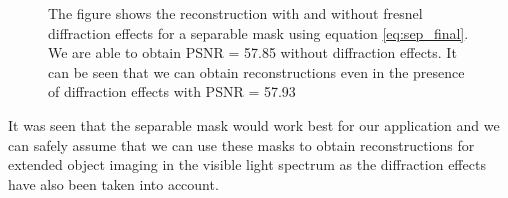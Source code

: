 \begin{figure}[ht]
\begin{subfigure}{0.5\textwidth}
    \end{subfigure}
    \caption{The figure shows the reconstruction with and without fresnel diffraction effects for a separable mask using equation \ref{eq:sep_final}. We are able to obtain PSNR = 57.85 without diffraction effects. It can be seen that we can obtain reconstructions even in the presence of diffraction effects with PSNR = 57.93 }
    \label{fig:rec_sep}
    \end{figure}
It was seen that the separable mask would work best for our application and we can safely assume that we can use these masks to obtain reconstructions for extended object imaging in the visible light spectrum as the diffraction effects have also been taken into account.     
   